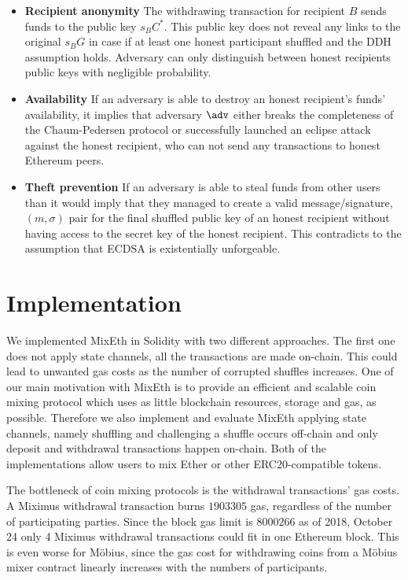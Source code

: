 \documentclass[a4paper]{article}
\theoremstyle{definition}
\begin{document}
\begin{itemize}
\item \textbf{Recipient anonymity}
The withdrawing transaction for recipient $B$ sends funds to the public key $s_{B}C^{*}$. This public key does not reveal any links to the original $s_{B}G$ in case if at least one honest participant shuffled and the DDH assumption holds. Adversary can only distinguish between honest recipients public keys with negligible probability.
\item \textbf{Availability}
If an adversary is able to destroy an honest recipient's funds' availability, it implies that adversary $\adv$ either breaks the completeness of the Chaum-Pedersen protocol or successfully launched an eclipse attack against the honest recipient, who can not send any transactions to honest Ethereum peers.
\item \textbf{Theft prevention} 
If an adversary is able to steal funds from other users than it would imply that they managed to create a valid message/signature, $(m,\sigma)$ pair for the final shuffled public key of an honest recipient without having access to the secret key of the honest recipient. This contradicts to the assumption that ECDSA is existentially unforgeable. 
\end{itemize}
\section{Implementation}

We implemented MixEth in Solidity with two different approaches. The first one does not apply state channels, all the transactions are made on-chain. This could lead to unwanted gas costs as the number of corrupted shuffles increases. One of our main motivation with MixEth is to provide an efficient and scalable coin mixing protocol which uses as little blockchain resources, storage and gas, as possible. Therefore we also implement and evaluate MixEth applying state channels, namely shuffling and challenging a shuffle occurs off-chain and only deposit and withdrawal transactions happen on-chain.
Both of the implementations allow users to mix Ether or other ERC20-compatible tokens.

The bottleneck of coin mixing protocols is the withdrawal transactions' gas costs. A Miximus withdrawal transaction burns $\num[group-separator={,}]{1903305}$ gas, regardless of the number of participating parties. Since the block gas limit is $\num[group-separator={,}]{8000266}$ as of 2018, October 24 only 4 Miximus withdrawal transactions could fit in one Ethereum block. This is even worse for Möbius, since the gas cost for withdrawing coins from a Möbius mixer contract linearly increases with the numbers of participants.
\end{document}
